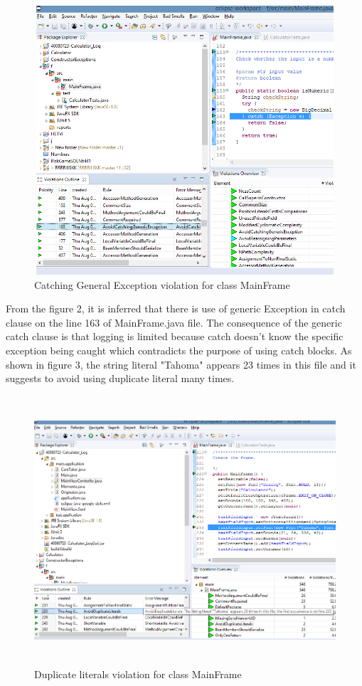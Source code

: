 \documentclass[12pt]{report}
\begin{document}
{\begin{figure}[h!]
    \includegraphics[width=16cm, height=10cm]{Image/automaticReview2.png}
    \caption{Catching General Exception violation for class MainFrame}
\end{figure}
\newline
\indent From the figure 2, it is inferred that there is use of generic Exception in catch clause on the line 163 of MainFrame.java file. The consequence of the generic catch clause is that logging is limited because catch doesn't know the specific exception being caught which contradicts the purpose of using catch blocks.
\noindent
\clearpage
As shown in figure 3, the string literal "Tahoma" appears 23 times in this file and it suggests to avoid using duplicate literal many times.\newline
\begin{figure}[h!]
    \includegraphics[width=16cm, height=10cm]{Image/automaticReview3.png}
    \caption{Duplicate literals violation for class MainFrame}
\end{figure}
\clearpage
}
\end{document}
